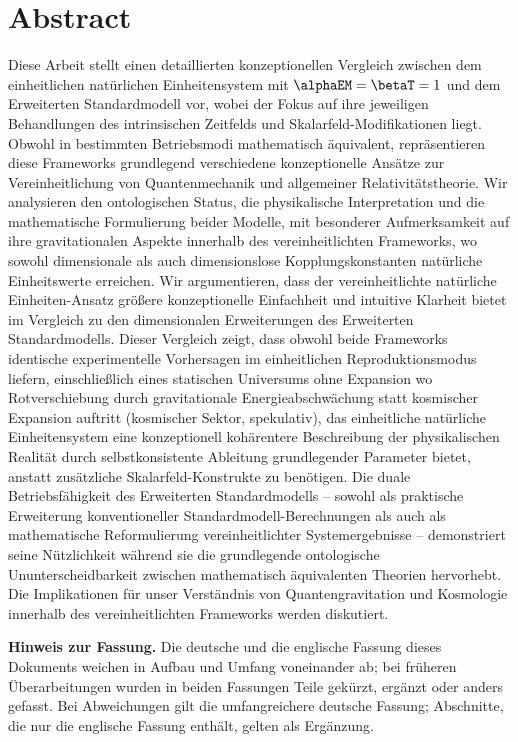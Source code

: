 \section*{Abstract}
		Diese Arbeit stellt einen detaillierten konzeptionellen Vergleich zwischen dem einheitlichen natürlichen Einheitensystem mit $\alphaEM = \betaT = 1$ und dem Erweiterten Standardmodell vor, wobei der Fokus auf ihre jeweiligen Behandlungen des intrinsischen Zeitfelds und Skalarfeld-Modifikationen liegt. Obwohl in bestimmten Betriebsmodi mathematisch äquivalent, repräsentieren diese Frameworks grundlegend verschiedene konzeptionelle Ansätze zur Vereinheitlichung von Quantenmechanik und allgemeiner Relativitätstheorie. Wir analysieren den ontologischen Status, die physikalische Interpretation und die mathematische Formulierung beider Modelle, mit besonderer Aufmerksamkeit auf ihre gravitationalen Aspekte innerhalb des vereinheitlichten Frameworks, wo sowohl dimensionale als auch dimensionslose Kopplungskonstanten natürliche Einheitswerte erreichen. Wir argumentieren, dass der vereinheitlichte natürliche Einheiten-Ansatz größere konzeptionelle Einfachheit und intuitive Klarheit bietet im Vergleich zu den dimensionalen Erweiterungen des Erweiterten Standardmodells. Dieser Vergleich zeigt, dass obwohl beide Frameworks identische experimentelle Vorhersagen im einheitlichen Reproduktionsmodus liefern, einschließlich eines statischen Universums ohne Expansion wo Rotverschiebung durch gravitationale Energieabschwächung statt kosmischer Expansion auftritt (kosmischer Sektor, spekulativ), das einheitliche natürliche Einheitensystem eine konzeptionell kohärentere Beschreibung der physikalischen Realität durch selbstkonsistente Ableitung grundlegender Parameter bietet, anstatt zusätzliche Skalarfeld-Konstrukte zu benötigen. Die duale Betriebsfähigkeit des Erweiterten Standardmodells – sowohl als praktische Erweiterung konventioneller Standardmodell-Berechnungen als auch als mathematische Reformulierung vereinheitlichter Systemergebnisse – demonstriert seine Nützlichkeit während sie die grundlegende ontologische Ununterscheidbarkeit zwischen mathematisch äquivalenten Theorien hervorhebt. Die Implikationen für unser Verständnis von Quantengravitation und Kosmologie innerhalb des vereinheitlichten Frameworks werden diskutiert.

	\medskip\noindent\textbf{Hinweis zur Fassung.} Die deutsche und die englische Fassung dieses Dokuments weichen in Aufbau und Umfang voneinander ab; bei früheren Überarbeitungen wurden in beiden Fassungen Teile gekürzt, ergänzt oder anders gefasst. Bei Abweichungen gilt die umfangreichere deutsche Fassung; Abschnitte, die nur die englische Fassung enthält, gelten als Ergänzung.


